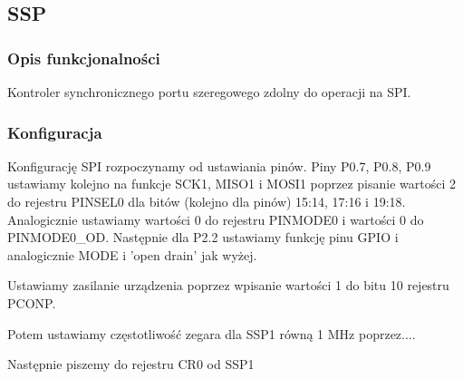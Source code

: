 \subsection{SSP}

\subsubsection{Opis funkcjonalności}

    Kontroler synchronicznego portu szeregowego zdolny do operacji
    na SPI.

\subsubsection{Konfiguracja}

    Konfigurację SPI rozpoczynamy od ustawiania pinów.
    Piny P0.7, P0.8, P0.9 ustawiamy kolejno na funkcje SCK1,
    MISO1 i MOSI1 poprzez pisanie wartości 2 do rejestru
    PINSEL0 dla bitów (kolejno dla pinów) 15:14, 17:16
    i 19:18. Analogicznie ustawiamy wartości 0 do rejestru
    PINMODE0 i wartości 0 do PINMODE0_OD. Następnie dla P2.2
    ustawiamy funkcję pinu GPIO i analogicznie MODE i 'open drain'
    jak wyżej.

    Ustawiamy zasilanie urządzenia poprzez wpisanie wartości 1
    do bitu 10 rejestru PCONP.

    Potem ustawiamy częstotliwość zegara dla SSP1 równą 1 MHz
    poprzez.... 

    Następnie piszemy do rejestru CR0 od SSP1

